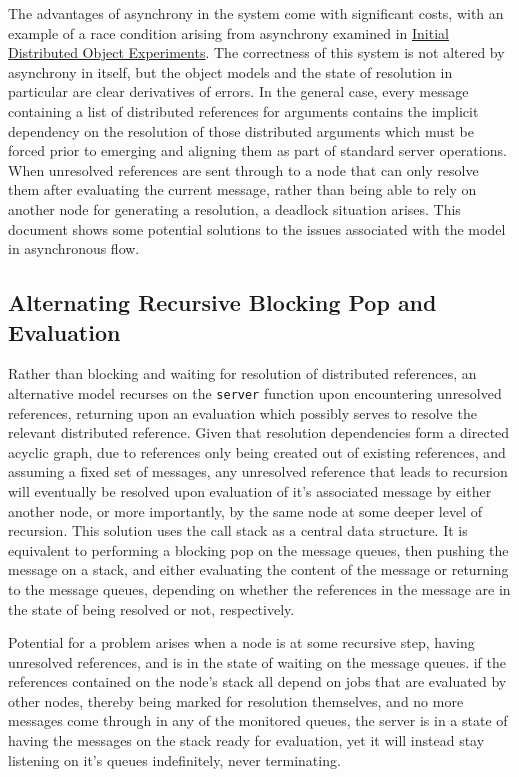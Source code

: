 The advantages of asynchrony in the system come with significant costs, with an
example of a race condition arising from asynchrony examined in
\href{ini-distobj-exp.pdf}{Initial Distributed Object Experiments}.
The correctness of this system is not altered by asynchrony in itself, but the
object models and the state of resolution in particular are clear derivatives
of errors.
In the general case, every message containing a list of distributed references
for arguments contains the implicit dependency on the resolution of those
distributed arguments which must be forced prior to emerging and aligning them
as part of standard server operations.
When unresolved references are sent through to a node that can only resolve
them after evaluating the current message, rather than being able to rely on
another node for generating a resolution, a deadlock situation arises.
This document shows some potential solutions to the issues associated with the
model in asynchronous flow.

\subsection{Alternating Recursive Blocking Pop and Evaluation}
\label{recurs-stack}
Rather than blocking and waiting for resolution of distributed references, an
alternative model recurses on the \texttt{server} function upon
encountering unresolved references, returning upon an evaluation which possibly
serves to resolve the relevant distributed reference.
Given that resolution dependencies form a directed acyclic graph, due to
references only being created out of existing references, and assuming a fixed
set of messages, any unresolved reference that leads to recursion will
eventually be resolved upon evaluation of it's associated message by either
another node, or more importantly, by the same node at some deeper level of
recursion.
This solution uses the call stack as a central data structure.
It is equivalent to performing a blocking pop on the message queues, then
pushing the message on a stack, and either evaluating the content of the
message or returning to the message queues, depending on whether the references
in the message are in the state of being resolved or not, respectively.

Potential for a problem arises when a node is at some recursive step, having
unresolved references, and is in the state of waiting on the message queues.
if the references contained on the node's stack all depend on jobs that are
evaluated by other nodes, thereby being marked for resolution themselves, and
no more messages come through in any of the monitored queues, the server is in
a state of having the messages on the stack ready for evaluation, yet it will
instead stay listening on it's queues indefinitely, never terminating.


